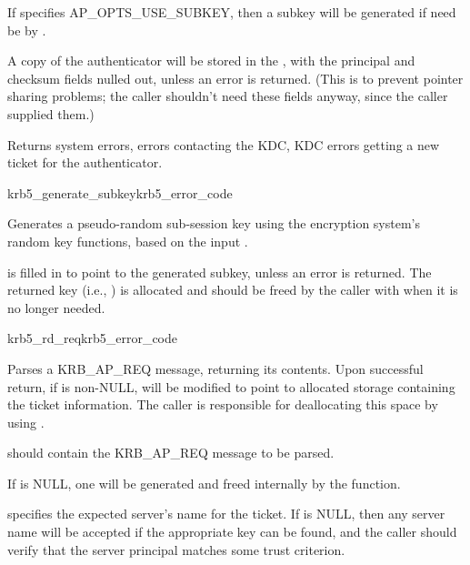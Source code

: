 If  specifies AP_OPTS_USE_SUBKEY, then a
subkey will be generated if need be by .

A copy of the authenticator will be stored in the
, with the principal and checksum fields nulled
out, unless an error is returned.  (This is to prevent pointer sharing
problems; the caller shouldn't need these fields anyway, since the
caller supplied them.)

Returns system errors, errors contacting the KDC, KDC errors getting
a new ticket for the authenticator.

\begin{funcdecl}{krb5_generate_subkey}{krb5_error_code}{\funcinout}
\funcin
{}
\funcout
{}
\end{funcdecl}

Generates a pseudo-random sub-session key using the encryption system's
random key functions, based on the input .

 is filled in to point to the generated subkey, unless
an error is returned.  The returned key (i.e., ) is
allocated and should be freed by the caller with
 when it is no longer needed.

\begin{funcdecl}{krb5_rd_req}{krb5_error_code}{\funcinout}
\funcin
{}
\funcinout
{}
\funcout
{}
\end{funcdecl}

Parses a KRB_AP_REQ message, returning its contents.  Upon successful
return, if  is non-NULL,  will be
modified to point to allocated storage containing the ticket
information.  The caller is responsible for deallocating this space by
using .

 should contain the KRB_AP_REQ message to be parsed.

If  is NULL, one will be generated and freed
internally by the function.

 specifies the expected server's name for the ticket.
If  is NULL, then any server name will be accepted if
the appropriate key can be found, and the caller should verify that the
server principal matches some trust criterion.

